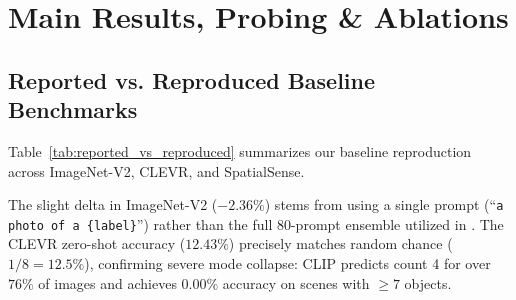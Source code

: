 \documentclass[conference]{IEEEtran}
\begin{document}
\section{Main Results, Probing \& Ablations}
\label{sec:results}

\subsection{Reported vs. Reproduced Baseline Benchmarks}
Table~\ref{tab:reported_vs_reproduced} summarizes our baseline reproduction across ImageNet-V2, CLEVR, and SpatialSense.

\begin{table}[h]
\centering
\caption{Reported vs. Reproduced Baseline Benchmarks.}
\label{tab:reported_vs_reproduced}
\end{table}

The slight delta in ImageNet-V2 ($-2.36\%$) stems from using a single prompt (``\texttt{a photo of a \{label\}}'') rather than the full 80-prompt ensemble utilized in \cite{radford2021learning}. The CLEVR zero-shot accuracy ($12.43\%$) precisely matches random chance ($1/8 = 12.5\%$), confirming severe mode collapse: CLIP predicts count 4 for over $76\%$ of images and achieves $0.00\%$ accuracy on scenes with $\ge 7$ objects.
\end{document}
